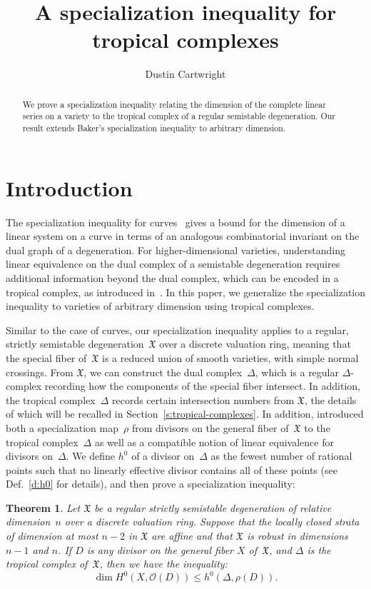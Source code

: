 \documentclass[11pt]{amsart}
\title{A specialization inequality for tropical complexes}
\author{Dustin Cartwright}
\newtheorem{thm}{Theorem}[section]
\theoremstyle{definition}
\newcommand{\X}{\mathfrak X}
\begin{document}
\begin{abstract}
We prove a specialization inequality relating the dimension of the complete
linear series on a variety to the tropical complex of a regular semistable
degeneration. Our result extends Baker's specialization inequality to arbitrary
dimension.
\end{abstract}

\maketitle

\section{Introduction}

The specialization inequality for curves~\cite{baker} gives a bound for the
dimension of a linear system on a curve in terms of an analogous combinatorial
invariant on the dual graph of a degeneration. For higher-dimensional varieties,
understanding linear equivalence on the dual complex of a semistable
degeneration requires additional information beyond the dual complex, which can
be encoded in a tropical complex, as introduced in~\cite{cartwright-complexes}.
In this paper, we generalize the specialization inequality to varieties of
arbitrary dimension using tropical complexes.

Similar to the case of curves, our specialization inequality applies to a
regular, strictly semistable degeneration~$\X$ over a discrete valuation ring,
meaning that the special fiber of~$\X$ is a reduced union of smooth varieties,
with simple normal crossings. From $\X$, we can construct the dual
complex~$\Delta$, which is a regular $\Delta$-complex recording how the
components of the special fiber intersect. In addition, the tropical
complex~$\Delta$ records certain intersection numbers from $\X$, the details of
which will be recalled in Section~\ref{s:tropical-complexes}. In addition,
\cite{cartwright-complexes} introduced both a specialization map~$\rho$ from
divisors on the general fiber of~$\X$ to the tropical complex~$\Delta$ as well
as a compatible notion of linear equivalence for divisors on~$\Delta$. We define
$h^0$ of a divisor on~$\Delta$ as the fewest number of rational points such that
no linearly effective divisor contains all of these points (see Def.~\ref{d:h0}
for details), and then prove a specialization inequality:

\begin{thm}\label{t:specialization}
Let $\X$ be a regular strictly semistable degeneration of relative dimension~$n$
over a discrete valuation ring. Suppose that the locally closed
strata of dimension at most $n-2$ in $\X$ are affine and that $\X$ is robust in
dimensions $n-1$ and $n$. If $D$ is any divisor on the general fiber $X$
of~$\X$, and $\Delta$ is the tropical complex of~$\X$, then we have the
inequality:
\begin{equation*}
\dim H^0(X, \mathcal O(D)) \leq h^0(\Delta, \rho(D)).
\end{equation*}
\end{thm}
\end{document}
